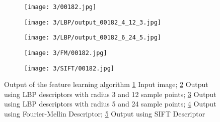 \documentclass[draft,final]{vutinfth} %
\begin{document}
\begin{figure}[h]
  \centering
  \begin{subfigure}[t]{0.19\columnwidth}
    \centering
    \texttt{[image: 3/00182.jpg]}
    \subcaption{}
    \label{fig:pe:182:orig}
  \end{subfigure}
  \begin{subfigure}[t]{0.19\columnwidth}
    \centering
    \texttt{[image: 3/LBP/output\_00182\_4\_12\_3.jpg]}
    \subcaption{}
    \label{fig:pe:182:LBPs}
  \end{subfigure}
  \begin{subfigure}[t]{0.19\columnwidth}
    \centering
    \texttt{[image: 3/LBP/output\_00182\_6\_24\_5.jpg]}
    \subcaption{}
    \label{fig:pe:182:LBPb}
  \end{subfigure}
  \begin{subfigure}[t]{0.19\columnwidth}
    \centering
    \texttt{[image: 3/FM/00182.jpg]}
    \subcaption{}
    \label{fig:pe:182:FM}
  \end{subfigure}
  \begin{subfigure}[t]{0.19\columnwidth}
    \centering
    \texttt{[image: 3/SIFT/00182.jpg]}
    \subcaption{}
    \label{fig:pe:182:SIFT}
  \end{subfigure}
  \caption{Output of the feature learning algorithm \ref{fig:pe:182:orig} Input image; \ref{fig:pe:182:LBPs} Output using LBP descriptors with radius 3 and 12 sample points; \ref{fig:pe:182:LBPb} Output using LBP descriptors with radius 5 and 24 sample points; \ref{fig:pe:182:FM} Output using Fourier-Mellin Descriptor; \ref{fig:pe:182:SIFT} Output using SIFT Descriptor}
  \label{fig:pe:182}
\end{figure}
\end{document}
